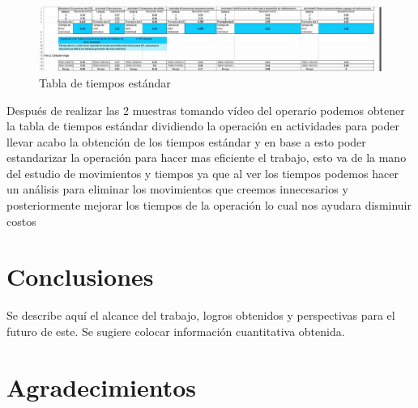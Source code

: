     
    
    \begin{figure}[H]
        \centering
        \includegraphics[trim = {0mm 0mm 0mm 0mm},clip,scale=0.3]{8/Img/Tiempos estandar.pdf}
        \caption{Tabla de tiempos estándar}
        \label{Tiempos estándar}
    \end{figure}
    
    Después de realizar las 2 muestras tomando vídeo del operario podemos obtener la tabla de tiempos estándar dividiendo la operación en actividades para poder llevar acabo la obtención de los tiempos estándar y en base a esto poder estandarizar la operación para hacer mas eficiente el trabajo, esto va de la mano del estudio de movimientos y tiempos ya que al ver los tiempos podemos hacer un análisis para eliminar los movimientos que creemos innecesarios y posteriormente mejorar los tiempos de la operación lo cual nos ayudara disminuir costos 
    
    
    
    \section{Conclusiones}
    
    Se describe aquí el alcance del trabajo, logros obtenidos y perspectivas para el futuro de este. Se sugiere colocar información cuantitativa obtenida.
    
    \section{Agradecimientos}
    
